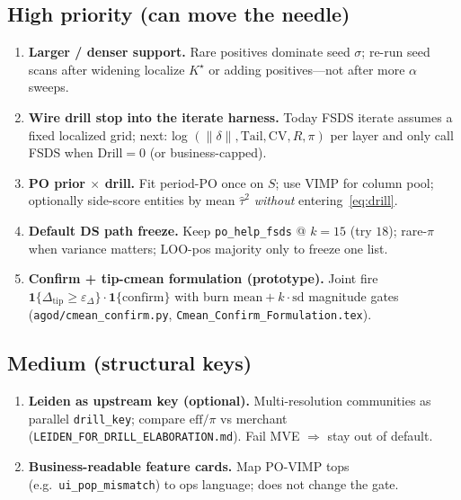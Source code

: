 \documentclass[11pt]{article}
\newcommand{\Drill}{\mathrm{Drill}}
\newcommand{\Tail}{\mathrm{Tail}}
\newcommand{\CV}{\mathrm{CV}}
\begin{document}
\subsection{High priority (can move the needle)}
\begin{enumerate}[leftmargin=*,itemsep=0.4em]
  \item \textbf{Larger / denser support.} Rare positives dominate seed
        $\sigma$; re-run seed scans after widening localize $K^\star$ or
        adding positives---not after more $\alpha$ sweeps.
  \item \textbf{Wire drill stop into the iterate harness.} Today FSDS
        iterate assumes a fixed localized grid; next: log
        $(\|\delta\|,\Tail,\CV,R,\pi)$ per layer and only call FSDS when
        $\Drill=0$ (or business-capped).
  \item \textbf{PO prior $\times$ drill.} Fit period-PO once on $S$;
        use VIMP for column pool; optionally side-score entities by
        mean $\hat\tau^2$ \emph{without} entering~\eqref{eq:drill}.
  \item \textbf{Default DS path freeze.} Keep
        \texttt{po\_help\_fsds} @ $k{=}15$ (try $18$); rare-$\pi$ when
        variance matters; LOO-pos majority only to freeze one list.
  \item \textbf{Confirm + tip-cmean formulation (prototype).}
        Joint fire
        $\mathbf{1}\{\Delta_{\mathrm{tip}}\ge\varepsilon_\Delta\}
        \cdot\mathbf{1}\{\mathrm{confirm}\}$
        with burn $\mathrm{mean}+k\cdot\mathrm{sd}$ magnitude gates
        (\texttt{agod/cmean\_confirm.py},
        \texttt{Cmean\_Confirm\_Formulation.tex}).
\end{enumerate}

\subsection{Medium (structural keys)}
\begin{enumerate}[leftmargin=*,itemsep=0.4em]
  \item \textbf{Leiden as upstream key (optional).}
        Multi-resolution communities as parallel \texttt{drill\_key};
        compare $\mathrm{eff}/\pi$ vs merchant
        (\texttt{LEIDEN\_FOR\_DRILL\_ELABORATION.md}).
        Fail MVE $\Rightarrow$ stay out of default.
  \item \textbf{Business-readable feature cards.}
        Map PO-VIMP tops (e.g.\ \texttt{ui\_pop\_mismatch}) to ops
        language; does not change the gate.
\end{enumerate}
\end{document}
